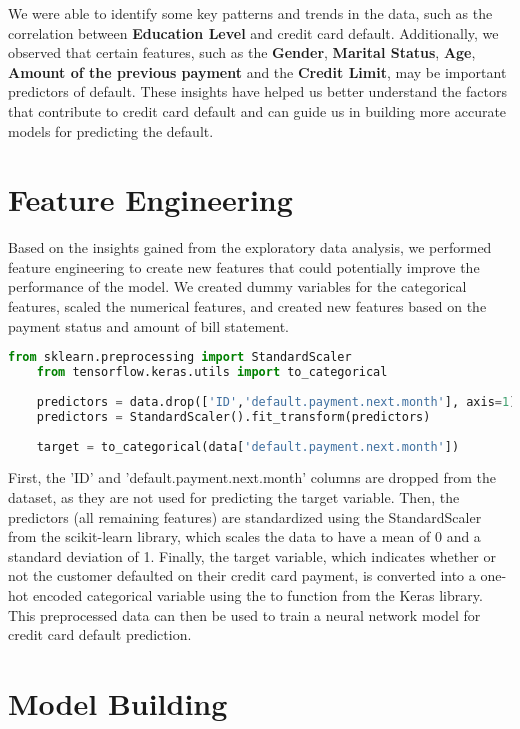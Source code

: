 \documentclass[12pt,a4paper,oneside]{article}
\begin{document}
	We were able to identify some key patterns and trends in the data, such as the correlation between \textbf{Education Level} and credit card default. Additionally, we observed that certain features, such as the \textbf{Gender}, \textbf{Marital Status}, \textbf{Age}, \textbf{Amount of the previous payment} and the \textbf{Credit Limit}, may be important predictors of default. These insights have helped us better understand the factors that contribute to credit card default and can guide us in building more accurate models for predicting the default.
	
	\section{Feature Engineering}
	Based on the insights gained from the exploratory data analysis, we performed feature engineering to create new features that could potentially improve the performance of the model. We created dummy variables for the categorical features, scaled the numerical features, and created new features based on the payment status and amount of bill statement.
	
	\begin{lstlisting}[language=Python,basicstyle=\footnotesize, breaklines=true]
	from sklearn.preprocessing import StandardScaler
	from tensorflow.keras.utils import to_categorical
	
	predictors = data.drop(['ID','default.payment.next.month'], axis=1).values
	predictors = StandardScaler().fit_transform(predictors)
	
	target = to_categorical(data['default.payment.next.month']) 
	\end{lstlisting}
	
	First, the 'ID' and 'default.payment.next.month' columns are dropped from the dataset, as they are not used for predicting the target variable. Then, the predictors (all remaining features) are standardized using the StandardScaler from the scikit-learn\cite{scikit} library, which scales the data to have a mean of 0 and a standard deviation of 1. Finally, the target variable, which indicates whether or not the customer defaulted on their credit card payment, is converted into a one-hot encoded categorical variable using the to function from the Keras library. This preprocessed data can then be used to train a neural network model for credit card default prediction.
	
	\section{Model Building}
	
\end{document}
